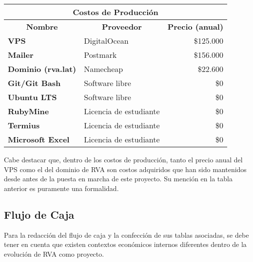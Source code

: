 \begin{center}
	\begin{tabular}{ | l | p{5cm} | p{5cm}|}
		\hline
		\multicolumn{3}{|c|}{\textbf{Costos de Producción}} \\
		\hline
		\multicolumn{1}{|c|}{\textbf{Nombre}} & \multicolumn{1}{|c|}{\textbf{Proveedor}} & \multicolumn{1}{|c|}{\textbf{Precio (anual)}} \\
		\hline
		{\textbf{VPS}} & DigitalOcean & \multicolumn{1}{|r|}{\$125.000} \\ \hline
		
		{\textbf{Mailer}} & Postmark & \multicolumn{1}{|r|}{\$156.000} \\ \hline
		
		{\textbf{Dominio (rva.lat)}} & Namecheap & \multicolumn{1}{|r|}{\$22.600} \\ \hline
		
		{\textbf{Git/Git Bash}} & Software libre & \multicolumn{1}{|r|}{\$0} \\ \hline
		
		{\textbf{Ubuntu LTS}} & Software libre & \multicolumn{1}{|r|}{\$0} \\ \hline
		
		{\textbf{RubyMine}} & Licencia de estudiante & \multicolumn{1}{|r|}{\$0} \\ \hline
		
		{\textbf{Termius}} & Licencia de estudiante & \multicolumn{1}{|r|}{\$0} \\ \hline
		
		{\textbf{Microsoft Excel}} & Licencia de estudiante & \multicolumn{1}{|r|}{\$0} \\ \hline
	\end{tabular}
\end{center}

Cabe destacar que, dentro de los costos de producción, tanto el precio anual del VPS como el del dominio de RVA son costos adquiridos que han sido mantenidos desde antes de la puesta en marcha de este proyecto. Su mención en la tabla anterior es puramente una formalidad.

\subsection{Flujo de Caja}
Para la redacción del flujo de caja y la confección de sus tablas asociadas, se debe tener en cuenta que existen contextos económicos internos diferentes dentro de la evolución de RVA como proyecto.


